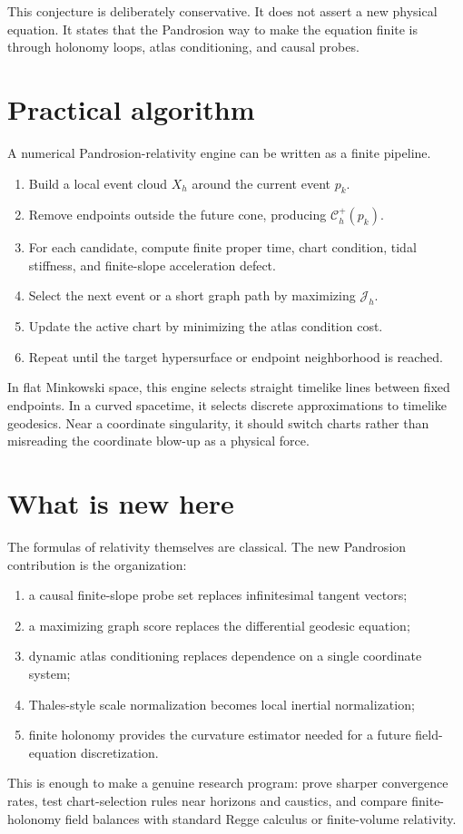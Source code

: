 \documentclass[11pt]{article}
\newcommand{\Cset}{\mathcal C}
\newcommand{\J}{\mathcal J}
\begin{document}
This conjecture is deliberately conservative.  It does not assert a new
physical equation.  It states that the Pandrosion way to make the equation
finite is through holonomy loops, atlas conditioning, and causal probes.

\section{Practical algorithm}

A numerical Pandrosion-relativity engine can be written as a finite pipeline.

\begin{enumerate}[label=\textbf{Step \arabic*.},leftmargin=*]
\item Build a local event cloud \(X_h\) around the current event \(p_k\).
\item Remove endpoints outside the future cone, producing \(\Cset_h^+(p_k)\).
\item For each candidate, compute finite proper time, chart condition, tidal
stiffness, and finite-slope acceleration defect.
\item Select the next event or a short graph path by maximizing \(\J_h\).
\item Update the active chart by minimizing the atlas condition cost.
\item Repeat until the target hypersurface or endpoint neighborhood is reached.
\end{enumerate}

In flat Minkowski space, this engine selects straight timelike lines between
fixed endpoints.  In a curved spacetime, it selects discrete approximations to
timelike geodesics.  Near a coordinate singularity, it should switch charts
rather than misreading the coordinate blow-up as a physical force.

\section{What is new here}

The formulas of relativity themselves are classical.  The new Pandrosion
contribution is the organization:
\begin{enumerate}[label=(\roman*)]
\item a causal finite-slope probe set replaces infinitesimal tangent vectors;
\item a maximizing graph score replaces the differential geodesic equation;
\item dynamic atlas conditioning replaces dependence on a single coordinate
system;
\item Thales-style scale normalization becomes local inertial normalization;
\item finite holonomy provides the curvature estimator needed for a future
field-equation discretization.
\end{enumerate}
This is enough to make a genuine research program: prove sharper convergence
rates, test chart-selection rules near horizons and caustics, and compare
finite-holonomy field balances with standard Regge calculus or finite-volume
relativity.
\end{document}
